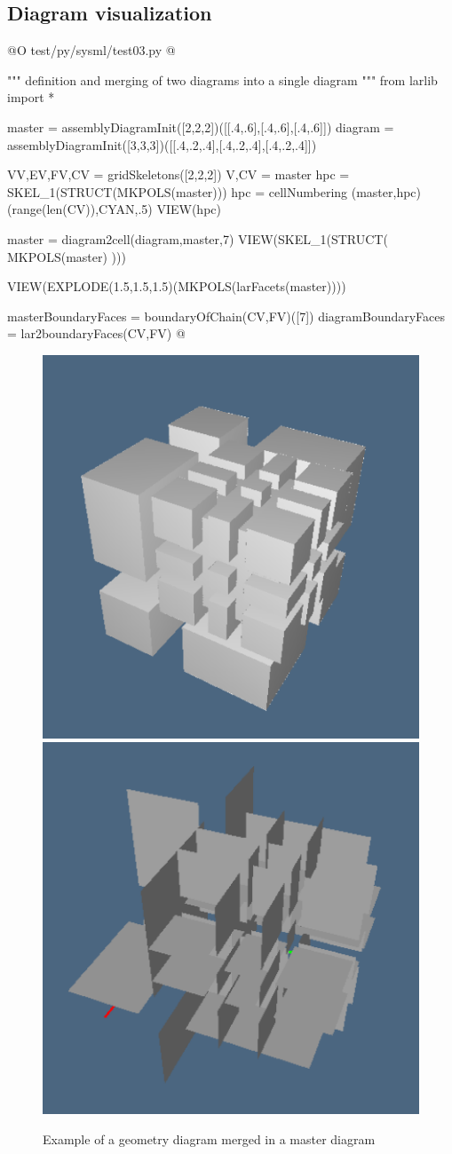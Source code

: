 \documentclass[11pt,oneside]{article}	%
\begin{document}
\subsection{Diagram visualization}


@O test/py/sysml/test03.py
@{""" definition and merging of two diagrams into a single diagram """
from larlib import *

master = assemblyDiagramInit([2,2,2])([[.4,.6],[.4,.6],[.4,.6]])
diagram = assemblyDiagramInit([3,3,3])([[.4,.2,.4],[.4,.2,.4],[.4,.2,.4]])

VV,EV,FV,CV = gridSkeletons([2,2,2])
V,CV = master
hpc = SKEL_1(STRUCT(MKPOLS(master)))
hpc = cellNumbering (master,hpc)(range(len(CV)),CYAN,.5)
VIEW(hpc)

master = diagram2cell(diagram,master,7)
VIEW(SKEL_1(STRUCT( MKPOLS(master) )))

VIEW(EXPLODE(1.5,1.5,1.5)(MKPOLS(larFacets(master))))

masterBoundaryFaces = boundaryOfChain(CV,FV)([7])
diagramBoundaryFaces = lar2boundaryFaces(CV,FV)
@}

\begin{figure}[htbp] %
   \centering
   \includegraphics[height=0.49\linewidth,width=0.49\linewidth]{images/mastermerged} 
   \includegraphics[height=0.49\linewidth,width=0.49\linewidth]{images/masterfacets} 
   \caption{Example of a geometry diagram merged in a master diagram}
   \label{fig:mastermerged}
\end{figure}
\end{document}
